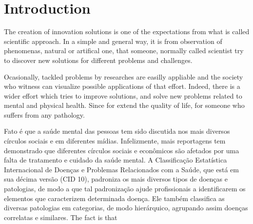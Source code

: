 \chapter{Introduction}\label{cap:introduction}

The creation of innovation solutions is one of the expectations from what is called scientific approach. In a simple and general way, it is from observation of phenomenas, natural or artifical one, that someone, normally called scientist try to discover new solutions for different problems and challenges.

Ocasionally, tackled problems by researches are easilly appliable and the society who witness can visualize possible applications of that effort. Indeed, there is a wider effort which tries to improve solutions, and solve new problems related to mental and physical health. Since for extend the quality of life, for someone who suffers from any pathology.

Fato é que a saúde mental das pessoas tem sido discutida nos mais diversos círculos sociais e em diferentes mídias. Infelizmente, mais reportagens tem demonstrado que diferentes círculos sociais e econômicos são afetados por uma falta de tratamento e cuidado da saúde mental. A Classificação Estatística Internacional de Doenças e Problemas Relacionados com a Saúde, que está em sua décima versão (CID 10), padroniza os mais diversos tipos de doenças e patologias, de modo a que tal padronização ajude profissionais a identificarem os elementos que caracterizem determinada doença. Ele também classifica as diversas patologias em categorias, de modo hierárquico, agrupando assim doenças correlatas e similares.
The fact is that

